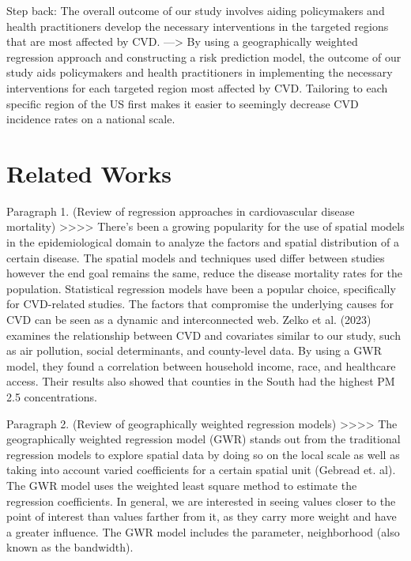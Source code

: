 \documentclass[
]{article}
\begin{document}
Step back: The overall outcome of our study involves aiding policymakers
and health practitioners develop the necessary interventions in the
targeted regions that are most affected by CVD. ---\textgreater{} By
using a geographically weighted regression approach and constructing a
risk prediction model, the outcome of our study aids policymakers and
health practitioners in implementing the necessary interventions for
each targeted region most affected by CVD. Tailoring to each specific
region of the US first makes it easier to seemingly decrease CVD
incidence rates on a national scale.

\section{Related Works}\label{related-works}

Paragraph 1. (Review of regression approaches in cardiovascular disease
mortality) \textgreater\textgreater\textgreater\textgreater{} There's
been a growing popularity for the use of spatial models in the
epidemiological domain to analyze the factors and spatial distribution
of a certain disease. The spatial models and techniques used differ
between studies however the end goal remains the same, reduce the
disease mortality rates for the population. Statistical regression
models have been a popular choice, specifically for CVD-related studies.
The factors that compromise the underlying causes for CVD can be seen as
a dynamic and interconnected web. Zelko et al. (2023) examines the
relationship between CVD and covariates similar to our study, such as
air pollution, social determinants, and county-level data. By using a
GWR model, they found a correlation between household income, race, and
healthcare access. Their results also showed that counties in the South
had the highest PM 2.5 concentrations.

Paragraph 2. (Review of geographically weighted regression models)
\textgreater\textgreater\textgreater\textgreater{} The geographically
weighted regression model (GWR) stands out from the traditional
regression models to explore spatial data by doing so on the local scale
as well as taking into account varied coefficients for a certain spatial
unit (Gebread et. al). The GWR model uses the weighted least square
method to estimate the regression coefficients. In general, we are
interested in seeing values closer to the point of interest than values
farther from it, as they carry more weight and have a greater influence.
The GWR model includes the parameter, neighborhood (also known as the
bandwidth).
\end{document}
